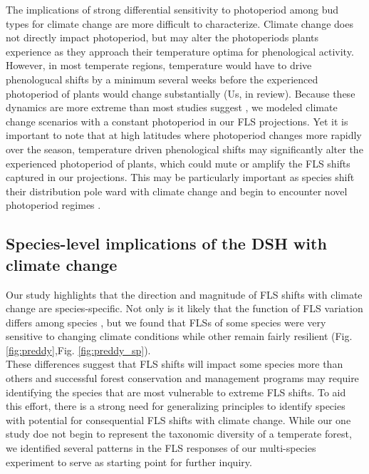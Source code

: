 \documentclass[11pt]{article}\usepackage[]{graphicx}\usepackage[]{color}
\begin{document}
\noindent The implications of strong differential sensitivity to photoperiod among bud types for climate change are more difficult to characterize. Climate change does not directly impact photoperiod, but may alter the photoperiods plants experience as they approach their temperature optima for phenological activity. However, in most temperate regions, temperature would have to drive phenologucal shifts by a minimum several weeks before the experienced photoperiod of plants would change substantially \citep{}(Us, in review). Because these dynamics are more extreme than most studies suggest \citep{Thackeray:2016aa}, we modeled climate change scenarios with a constant photoperiod in our FLS projections. Yet it is important to note that at high latitudes where photoperiod changes more rapidly over the season, temperature driven phenological shifts may significantly alter the experienced photoperiod of plants, which could mute or amplify the FLS shifts captured in our projections. This may be particularly important as species shift their distribution pole ward with climate change and begin to encounter novel photoperiod regimes \citep{WAY:2015aa}.\\

\subsection*{Species-level implications of the DSH with climate change}
\noindent  Our study highlights that the direction and magnitude of FLS shifts with climate change are species-specific. Not only is it likely that the function of FLS variation differs among species \citep{Buonaiuto2020}, but we found that FLSs of some species were very sensitive to changing climate conditions while other remain fairly resilient (Fig. \ref{fig:preddy},Fig. \ref{fig:preddy_sp}).\\

\noident These differences suggest that FLS shifts will impact some species more than others and successful forest conservation and management programs may require identifying the species that are most vulnerable to extreme FLS shifts. To aid this effort, there is a strong need for generalizing principles to identify species with potential for consequential FLS shifts with climate change. While our one study doe not begin to represent the taxonomic diversity of a temperate forest, we identified several patterns in the FLS responses of our multi-species experiment to serve as starting point for further inquiry.\\ 
\end{document}
